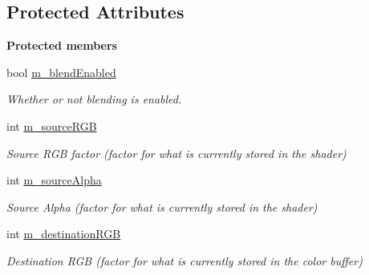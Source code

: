 \subsection*{Protected Attributes}
\begin{Indent}\textbf{ Protected members}\par
\begin{DoxyCompactItemize}
\item 
\mbox{\label{classrev_1_1_blend_setting_a500f2fd75e6767501b38260e6b4a4fe5}} 
bool \mbox{\hyperlink{classrev_1_1_blend_setting_a500f2fd75e6767501b38260e6b4a4fe5}{m\+\_\+blend\+Enabled}}
\begin{DoxyCompactList}\small\item\em Whether or not blending is enabled. \end{DoxyCompactList}\item 
\mbox{\label{classrev_1_1_blend_setting_af6176728f0a23c17fd6b77d4e78cf785}} 
int \mbox{\hyperlink{classrev_1_1_blend_setting_af6176728f0a23c17fd6b77d4e78cf785}{m\+\_\+source\+R\+GB}}
\begin{DoxyCompactList}\small\item\em Source R\+GB factor (factor for what is currently stored in the shader) \end{DoxyCompactList}\item 
\mbox{\label{classrev_1_1_blend_setting_a9ab0602195c21cf0c3d8572437a56803}} 
int \mbox{\hyperlink{classrev_1_1_blend_setting_a9ab0602195c21cf0c3d8572437a56803}{m\+\_\+source\+Alpha}}
\begin{DoxyCompactList}\small\item\em Source Alpha (factor for what is currently stored in the shader) \end{DoxyCompactList}\item 
\mbox{\label{classrev_1_1_blend_setting_af70032e8c9b779129e41a73a2dd72b2d}} 
int \mbox{\hyperlink{classrev_1_1_blend_setting_af70032e8c9b779129e41a73a2dd72b2d}{m\+\_\+destination\+R\+GB}}
\begin{DoxyCompactList}\small\item\em Destination R\+GB (factor for what is currently stored in the color buffer) \end{DoxyCompactList}\item 

\end{DoxyCompactItemize}
\end{Indent}
